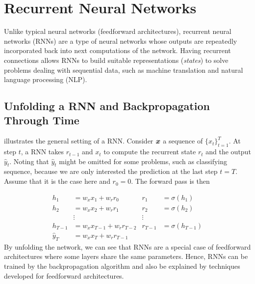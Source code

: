 \section{Recurrent Neural Networks}
Unlike typical neural networks (feedforward architectures), recurrent neural networks (RNNs) are a type of neural networks whose outputs are repeatedly incorporated back into next computations of the network. Having recurrent connections allows RNNs to build suitable representations (\textit{states}) to solve problems dealing with sequential data,  such as machine translation and natural language processing (NLP).

\subsection{Unfolding a RNN and Backpropagation Through Time}
 
\addfigure{\ref{fig:rnn_unfold}} illustrates the general setting of a RNN. Consider $\boldsymbol{x}$ a sequence of $\{ x_t \}_{t=1}^{T}$.  At step $t$, a RNN takes $r_{t-1}$ and $x_{t}$ to compute the recurrent state $r_{t}$ and the output $\hat{y}_t$. Noting that $\hat{y}_t$ might be omitted for some problems, such as classifying sequence, because we are only interested  the prediction at the last step $t=T$. Assume that it is the case here and $r_0 = 0$.  The forward pass is then

\begin{align*}
	h_1 &= w_{x} x_1 + w_{r} r_0 & r_1 &= \sigma(h_1)  \\
	h_2 &= w_{x} x_2 + w_{r} r_1 &  r_2 &= \sigma(h_2) \\
	& \vdots & \vdots \\
	h_{T-1} &= w_{x} x_{T-1} + w_{r} r_{T-2} &  r_{T-1} &= \sigma(h_{T-1}) \\
	\hat{y}_T &= w_{x} x_T   + w_{r} r_{T-1}
\end{align*}
By unfolding the network,  we can see that RNNs are a special case of feedforward architectures where some layers share the same parameters. Hence, RNNs can be trained by the backpropagation algorithm and also be explained by techniques developed for feedforward architectures.


%



